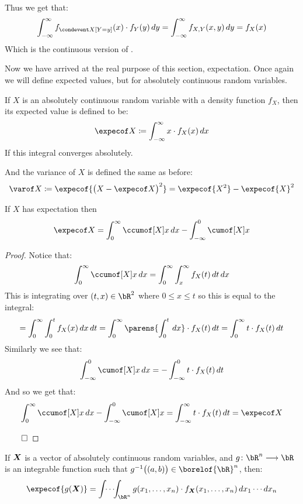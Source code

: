Thus we get that:
\[ \int_{-\infty}^\infty f_{\condevent X[Y=y]}(x)\cdot f_{Y}(y)\,dy = \int_{-\infty}^\infty f_{X,Y}(x,y)\,dy = f_X(x) \]
Which is the continuous version of .

Now we have arrived at the real purpose of this section, expectation.
Once again we will define expected values, but for absolutely continuous random variables.

\begin{defn*}

	If $X$ is an absolutely continuous random variable with a density function $f_X$, then its expected value is
	defined to be:
	\[ \expecof X\coloneqq\int_{-\infty}^\infty x\cdot f_X(x)\,dx \]
	If this integral converges absolutely.

	And the variance of $X$ is defined the same as before:
	\[ \varof X\coloneqq\expecof{\big(X-\expecof X\big)^2} = \expecof{X^2}-\expecof{X}^2 \]

\end{defn*}

\begin{lemm*}

	If $X$ has expectation then
	\[ \expecof X = \int_0^\infty \ccumof[X]x\,dx - \int_{-\infty}^0 \cumof[X]x \]

\end{lemm*}

\begin{proof}

	Notice that:
	\[ \int_0^\infty\ccumof[X]x\,dx = \int_0^\infty\int_x^\infty f_X(t)\,dt\,dx \]
	This is integrating over $(t,x)\in\bR^2$ where $0\leq x\leq t$ so this is equal to the integral:
	\[ = \int_0^\infty \int_0^t f_X(x)\,dx\,dt = \int_0^\infty \parens{\int_0^t\,dx}\cdot f_X(t)\,dt = \int_0^\infty t\cdot f_X(t)\,dt \]
	Similarly we see that:
	\[ \int_{-\infty}^0\cumof[X]x\,dx = -\int_{-\infty}^0 t\cdot f_X(t)\,dt \]
	And so we get that:
	\[ \int_0^\infty \ccumof[X]x\,dx - \int_{-\infty}^0 \cumof[X]x = \int_{-\infty}^\infty t\cdot f_X(t)\,dt = \expecof X \]

	\hfill$\qed$

\end{proof}


\begin{thrm*}

	If $\boldsymbol{X}$ is a vector of absolutely continuous random variables, and $g\colon\bR^n\longrightarrow\bR$ is an integrable function such that
	$g^{-1}\big((a,b)\big)\in\borelof{\bR}^n$, then:
	\[ \expecof{g(\jpv)} = \int\!\!\cdots\!\!\int_{\bR^n}g(x_1,\dots,x_n)\cdot f_{\jpv}(x_1,\dots,x_n)\,dx_1\cdots dx_n \]

\end{thrm*}


